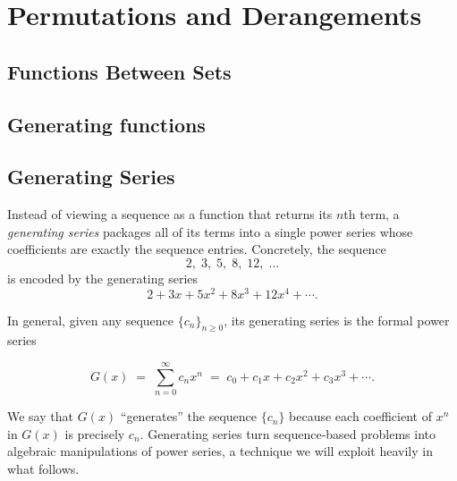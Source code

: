 \documentclass{article}
\begin{document}
\section{Permutations and Derangements}
\begingroup
  \renewcommand{\section}{\subsection}
  
\endgroup


\section{Functions Between Sets}
\begingroup
  \let\maketitle\relax
  
\endgroup

\section{Generating functions}
\subsection*{Generating Series}

Instead of viewing a sequence as a function that returns its \(n\)th term, a \emph{generating series} packages all of its terms into a single power series whose coefficients are exactly the sequence entries.  Concretely, the sequence
\[
2,\;3,\;5,\;8,\;12,\;\dots
\]
is encoded by the generating series
\[
2 + 3x + 5x^2 + 8x^3 + 12x^4 + \cdots.
\]

In general, given any sequence \(\{c_n\}_{n\ge0}\), its generating series is the formal power series

\[
G(x) \;=\; \sum_{n=0}^\infty c_n x^n 
\;=\;
c_0 + c_1 x + c_2 x^2 + c_3 x^3 + \cdots.
\]

We say that \(G(x)\) “generates” the sequence \(\{c_n\}\) because each coefficient of \(x^n\) in \(G(x)\) is precisely \(c_n\).  Generating series turn sequence‑based problems into algebraic manipulations of power series, a technique we will exploit heavily in what follows.
\end{document}

